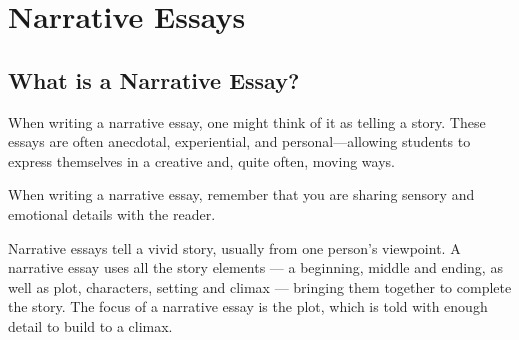 \chapter{Narrative Essays}

\section{What is a Narrative Essay?}
	When writing a narrative essay, one might think of it as telling a story. These essays are often anecdotal, experiential, and personal—allowing students to express themselves in a creative and, quite often, moving ways. 
	
	When writing a narrative essay, remember that you are sharing sensory and emotional details with the reader.
	
	Narrative essays tell a vivid story, usually from one person's viewpoint. A narrative essay uses all the story elements — a beginning, middle and ending, as well as plot, characters, setting and climax — bringing them together to complete the story. The focus of a narrative essay is the plot, which is told with enough detail to build to a climax.


